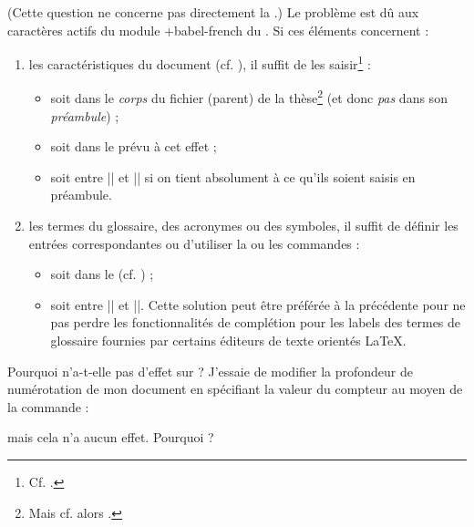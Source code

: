 (Cette question ne concerne pas directement la \yatCl{}.) Le problème
est dû aux caractères actifs du module \package*+{babel-french} du
. Si ces éléments concernent :
\begin{enumerate}
\item les caractéristiques du document (cf. ), il
  suffit de les saisir\footnote{Cf. .} :
  \begin{itemize}
  \item soit dans le \emph{corps} du fichier (parent) de la thèse\footnote{Mais
      cf. alors .} (et donc \emph{pas} dans son
    \emph{préambule}) ;
  \item soit dans le \File{\characteristicsfile} prévu à cet effet ;
  \item soit entre || et || si on tient
    absolument à ce qu'ils soient saisis en préambule.
  \end{itemize}
\item les termes du glossaire, des acronymes ou des symboles, il suffit de
  définir les entrées correspondantes ou d'utiliser la ou les commandes
   :
  \begin{itemize}
  \item soit dans le \File{\configurationfile}
    (cf. ) ;
  \item soit entre || et ||. Cette solution
    peut être préférée à la précédente pour ne pas perdre les fonctionnalités de
    complétion pour les labels des termes de glossaire fournies par certains
    éditeurs de texte orientés \LaTeX{}.
  \end{itemize}
\end{enumerate}

\begin{dbfaq}{Pourquoi \protect{} n'a-t-elle pas
    d'effet sur \protect{} ?}{}
  J'essaie de modifier la profondeur de numérotation de mon document en
  spécifiant la valeur du compteur  au moyen de la
  commande :
\begin{preamblecode}
\end{preamblecode}
  mais cela n'a aucun effet. Pourquoi ?
\end{dbfaq}

